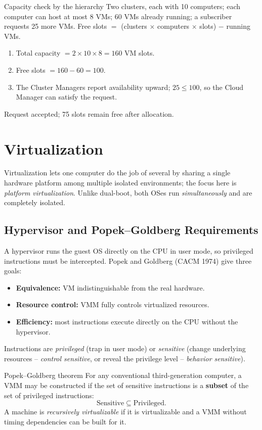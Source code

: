 \begin{solved}{Capacity check by the hierarchy}
\Given Two clusters, each with 10 computers; each computer can host at most 8 VMs; 60 VMs already running; a subscriber requests 25 more VMs.
\Formula Free slots $=$ (clusters $\times$ computers $\times$ slots) $-$ running VMs.
\Steps
\begin{enumerate}[leftmargin=*]
  \item Total capacity $= 2 \times 10 \times 8 = 160$ VM slots.
  \item Free slots $= 160 - 60 = 100$.
  \item The Cluster Managers report availability upward; $25 \le 100$, so the Cloud Manager can satisfy the request.
\end{enumerate}
\Answer Request accepted; 75 slots remain free after allocation.
\end{solved}

\section{Virtualization}
Virtualization lets one computer do the job of several by sharing a single hardware platform among multiple
isolated environments; the focus here is \emph{platform virtualization}. Unlike dual-boot, both OSes run
\emph{simultaneously} and are completely isolated.

\subsection{Hypervisor and Popek--Goldberg Requirements}
A hypervisor runs the guest OS directly on the CPU in user mode, so privileged instructions must be
intercepted. Popek and Goldberg (CACM 1974) give three goals:
\begin{itemize}[leftmargin=*]
  \item \textbf{Equivalence:} VM indistinguishable from the real hardware.
  \item \textbf{Resource control:} VMM fully controls virtualized resources.
  \item \textbf{Efficiency:} most instructions execute directly on the CPU without the hypervisor.
\end{itemize}
Instructions are \emph{privileged} (trap in user mode) or \emph{sensitive} (change underlying resources --
\emph{control sensitive}, or reveal the privilege level -- \emph{behavior sensitive}).

\begin{thmbox}{Popek--Goldberg theorem}
For any conventional third-generation computer, a VMM may be constructed if the set of sensitive
instructions is a \textbf{subset} of the set of privileged instructions:
\[ \text{Sensitive} \subseteq \text{Privileged}. \]
A machine is \emph{recursively virtualizable} if it is virtualizable and a VMM without timing dependencies
can be built for it.
\end{thmbox}

